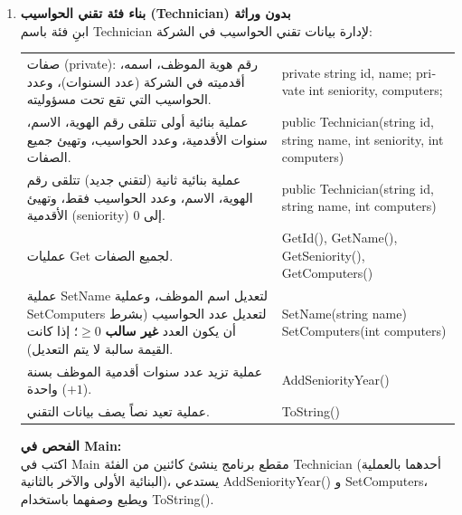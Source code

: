\documentclass[14pt]{extarticle}
\begin{document}
\begin{enumerate}[label=\textbf{تمرين \arabic*:}, wide=0pt, leftmargin=*, itemsep=2.2em]

    \item \textbf{بناء فئة تقني الحواسيب (\textenglish{Technician}) بدون وراثة} \\
    ابنِ فئة باسم \textenglish{Technician} لإدارة بيانات تقني الحواسيب في الشركة:

    {\centering
    \renewcommand{\arraystretch}{1.2}
    \small
    \begin{tabular}{|>{\raggedleft\arraybackslash}p{}|>{\raggedright\arraybackslash}p{}|}
    \hline
    \multicolumn{2}{|c|}{\textbf{الفئة: \textenglish{Technician}}} \\
    \hline
    صفات (\textenglish{private}): رقم هوية الموظف، اسمه، أقدميته في الشركة (عدد السنوات)، وعدد الحواسيب التي تقع تحت مسؤوليته. & \textenglish{private string id, name;} \newline \textenglish{private int seniority, computers;} \\
    \hline
    عملية بنائية أولى تتلقى رقم الهوية، الاسم، سنوات الأقدمية، وعدد الحواسيب، وتهيئ جميع الصفات. & \textenglish{public Technician(string id, string name, int seniority, int computers)} \\
    \hline
    عملية بنائية ثانية (لتقني جديد) تتلقى رقم الهوية، الاسم، وعدد الحواسيب فقط، وتهيئ الأقدمية (\textenglish{seniority}) إلى \textenglish{0}. & \textenglish{public Technician(string id, string name, int computers)} \\
    \hline
    عمليات \textenglish{Get} لجميع الصفات. & \textenglish{GetId(), GetName(), GetSeniority(), GetComputers()} \\
    \hline
    عملية \textenglish{SetName} لتعديل اسم الموظف، وعملية \textenglish{SetComputers} لتعديل عدد الحواسيب (بشرط أن يكون العدد \textbf{غير سالب} $\ge 0$؛ إذا كانت القيمة سالبة لا يتم التعديل). & \textenglish{SetName(string name)} \newline \textenglish{SetComputers(int computers)} \\
    \hline
    عملية تزيد عدد سنوات أقدمية الموظف بسنة واحدة ($+1$). & \textenglish{AddSeniorityYear()} \\
    \hline
    عملية تعيد نصاً يصف بيانات التقني. & \textenglish{ToString()} \\
    \hline
    \end{tabular}
    \par} %

    \vspace{2em}
    \noindent \textbf{الفحص في \textenglish{Main}:} \\
    اكتب في \textenglish{Main} مقطع برنامج ينشئ كائنين من الفئة \textenglish{Technician} (أحدهما بالعملية البنائية الأولى والآخر بالثانية)، يستدعي \textenglish{AddSeniorityYear()} و \textenglish{SetComputers}، ويطبع وصفهما باستخدام \textenglish{ToString()}.


\end{enumerate}
\end{document}
